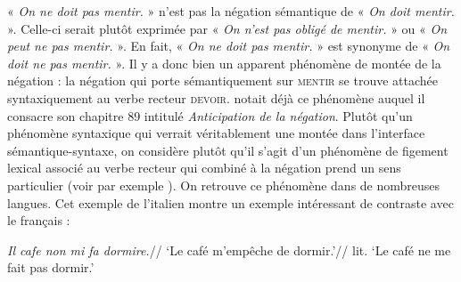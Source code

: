 { « \textit{On ne doit pas mentir.} » n’est pas la négation sémantique de « \textit{On doit mentir.} ». Celle-ci serait plutôt exprimée par « \textit{On n’est pas obligé de mentir.} » ou « \textit{On peut ne pas mentir.} ». En fait, « \textit{On ne doit pas mentir.} » est synonyme de « \textit{On doit ne pas mentir.} ». Il y a donc bien un apparent phénomène de montée de la négation : la négation qui porte sémantiquement sur \textsc{mentir} se trouve attachée syntaxiquement au verbe recteur \textsc{devoir}. \cite{tesniere1959elements} notait déjà ce phénomène auquel il consacre son chapitre 89 intitulé \textit{Anticipation de la négation}. Plutôt qu’un phénomène syntaxique qui verrait véritablement une montée dans l’interface sémantique-syntaxe, on considère plutôt qu’il s’agit d’un phénomène de figement lexical associé au verbe recteur qui combiné à la négation prend un sens particulier (voir par exemple \cite{forest1994negation}). On retrouve ce phénomène dans de nombreuses langues. Cet exemple de l’italien montre un exemple intéressant de contraste avec le français :

\begin{exe}
\exi{} \textit{Il cafe non mi fa dormire.}//
‘Le café m’empêche de dormir.’//
lit. ‘Le café ne me fait pas dormir.’
\end{exe}}
